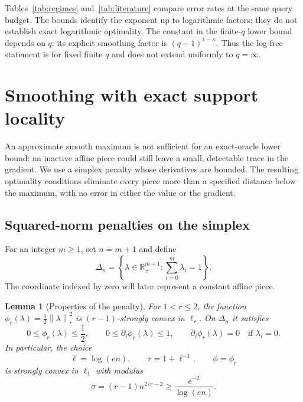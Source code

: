 \documentclass[11pt,a4paper]{article}
\newtheorem{lemma}[theorem]{Lemma}
\theoremstyle{definition}
\theoremstyle{remark}
\newcommand{\R}{\mathbb R}
\newcommand{\norm}[1]{\left\lVert #1\right\rVert}
\begin{document}
Tables~\ref{tab:regimes} and~\ref{tab:literature} compare error rates at the
same query budget. The bounds identify the exponent up to logarithmic factors;
they do not establish exact logarithmic optimality. The constant in the
finite-$q$ lower bound depends on $q$: its explicit smoothing factor is
$(q-1)^{1-\kappa}$. Thus the log-free statement is for fixed finite $q$ and
does not extend uniformly to $q=\infty$.

\section{Smoothing with exact support locality}\label{sec:smoothing}

An approximate smooth maximum is not sufficient for an exact-oracle lower
bound: an inactive affine piece could still leave a small, detectable trace
in the gradient. We use a simplex penalty whose derivatives are bounded.
The resulting optimality conditions eliminate every piece more than a
specified distance below the maximum, with no error in either the value or
the gradient.

\subsection{Squared-norm penalties on the simplex}

For an integer $m\ge1$, set $n=m+1$ and define
\[
  \Delta_n=\left\{\lambda\in\R_+^{m+1}:
                     \sum_{i=0}^m\lambda_i=1\right\}.
\]
The coordinate indexed by zero will later represent a constant affine piece.

\begin{lemma}[Properties of the penalty]\label{lem:regularizer}
For $1<r\le2$, the function
$\phi_r(\lambda)=\tfrac12\norm{\lambda}_r^2$ is
$(r-1)$-strongly convex in $\ell_r$. On $\Delta_n$ it satisfies
\begin{equation}\label{eq:penalty-bounds}
  0\le\phi_r(\lambda)\le\frac12,\qquad
  0\le\partial_i\phi_r(\lambda)\le1,\qquad
  \partial_i\phi_r(\lambda)=0\quad\text{if }\lambda_i=0.
\end{equation}
In particular, the choice
\begin{equation}\label{eq:regularizer}
  \ell=\log(en),\qquad r=1+\ell^{-1},\qquad \phi=\phi_r
\end{equation}
is strongly convex in $\ell_1$ with modulus
\begin{equation}\label{eq:sigma}
  \sigma=(r-1)n^{2/r-2}\ge\frac{e^{-2}}{\log(en)}.
\end{equation}
\end{lemma}
\end{document}
